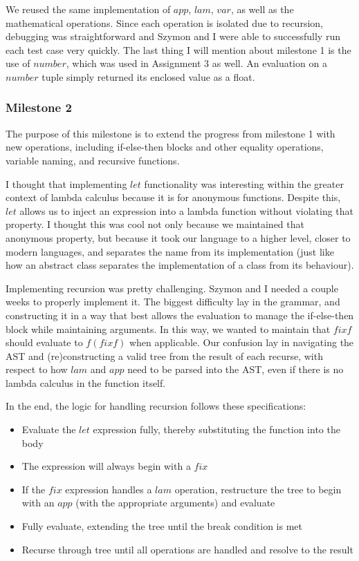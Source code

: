 \documentclass{article}
\theoremstyle{theorem}
\theoremstyle{definition}
\theoremstyle{remark}
\begin{document}
We reused the same implementation of $app$, $lam$, $var$, as well as the mathematical operations. Since each operation is isolated due to recursion, debugging was straightforward and Szymon and I were able to successfully run each test case very quickly. The last thing I will mention about milestone 1 is the use of $number$, which was used in Assignment 3 as well. An evaluation on a $number$ tuple simply returned its enclosed value as a float. 

\subsubsection{Milestone 2}

The purpose of this milestone is to extend the progress from milestone 1 with new operations, including if-else-then blocks and other equality operations, variable naming, and recursive functions.

I thought that implementing $let$ functionality was interesting within the greater context of lambda calculus because it is for anonymous functions. Despite this, $let$ allows us to inject an expression into a lambda function without violating that property. I thought this was cool not only because we maintained that anonymous property, but because it took our language to a higher level, closer to modern languages, and separates the name from its implementation (just like how an abstract class separates the implementation of a class from its behaviour).

Implementing recursion was pretty challenging. Szymon and I needed a couple weeks to properly implement it. The biggest difficulty lay in the grammar, and constructing it in a way that best allows the evaluation to manage the if-else-then block while maintaining arguments. In this way, we wanted to maintain that $fix f$ should evaluate to $f(fix f)$ when applicable. Our confusion lay in navigating the AST and (re)constructing a valid tree from the result of each recurse, with respect to how $lam$ and $app$ need to be parsed into the AST, even if there is no lambda calculus in the function itself.

In the end, the logic for handling recursion follows these specifications:

\begin{itemize}
  \item Evaluate the $let$ expression fully, thereby substituting the function into the body
  \item The expression will always begin with a $fix$
  \item If the $fix$ expression handles a $lam$ operation, restructure the tree to begin with an $app$ (with the appropriate arguments) and evaluate
  \item Fully evaluate, extending the tree until the break condition is met
  \item Recurse through tree until all operations are handled and resolve to the result
\end{itemize}
\end{document}
